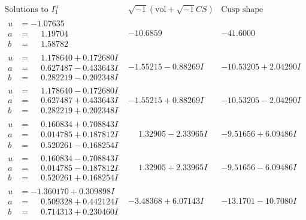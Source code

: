 \documentclass[1p]{elsarticle_modified}
\theoremstyle{definition}
\newcommand{\I}{\sqrt{-1}}
\begin{document}
$$\begin{array}{c|c|c}  
\text{Solutions to }I^u_{1}& \I (\text{vol} + \sqrt{-1}CS) & \text{Cusp shape}\\
 \hline 
\begin{aligned}
u &= -1.07635\phantom{ +0.000000I} \\
a &= \phantom{-}1.19704\phantom{ +0.000000I} \\
b &= \phantom{-}1.58782\phantom{ +0.000000I}\end{aligned}
 & -10.6859\phantom{ +0.000000I} & -41.6000\phantom{ +0.000000I} \\ \hline\begin{aligned}
u &= \phantom{-}1.178640 + 0.172680 I \\
a &= \phantom{-}0.627487 - 0.433643 I \\
b &= \phantom{-}0.282219 - 0.202348 I\end{aligned}
 & -1.55215 - 0.88269 I & -10.53205 + 2.04290 I \\ \hline\begin{aligned}
u &= \phantom{-}1.178640 - 0.172680 I \\
a &= \phantom{-}0.627487 + 0.433643 I \\
b &= \phantom{-}0.282219 + 0.202348 I\end{aligned}
 & -1.55215 + 0.88269 I & -10.53205 - 2.04290 I \\ \hline\begin{aligned}
u &= \phantom{-}0.160834 + 0.708843 I \\
a &= \phantom{-}0.014785 + 0.187812 I \\
b &= \phantom{-}0.520261 - 0.168254 I\end{aligned}
 & \phantom{-}1.32905 - 2.33965 I & -9.51656 + 6.09486 I \\ \hline\begin{aligned}
u &= \phantom{-}0.160834 - 0.708843 I \\
a &= \phantom{-}0.014785 - 0.187812 I \\
b &= \phantom{-}0.520261 + 0.168254 I\end{aligned}
 & \phantom{-}1.32905 + 2.33965 I & -9.51656 - 6.09486 I \\ \hline\begin{aligned}
u &= -1.360170 + 0.309898 I \\
a &= \phantom{-}0.509328 + 0.442124 I \\
b &= \phantom{-}0.714313 + 0.230460 I\end{aligned}
 & -3.48368 + 6.07143 I & -13.1701 - 10.7080 I \\ \hline\begin{aligned}

\end{aligned}
\end{array}$$
\end{document}
